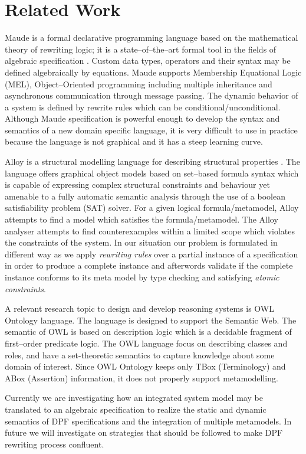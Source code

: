 \documentclass{eceasst}
\begin{document}
\section{Related Work}\label{lbl:relatedwork}
Maude is a formal declarative programming language based on the mathematical theory of rewriting logic; 
it is a state--of--the--art formal tool in the fields of algebraic specification \cite{Leeuwen90}. 
Custom data types, operators and their syntax may be defined algebraically by equations. 
Maude supports Membership Equational Logic (MEL), Object--Oriented programming including multiple inheritance and asynchronous communication through message passing.
The dynamic behavior of a system is defined by rewrite rules which can be conditional/unconditional. 
Although Maude specification is powerful enough to develop the syntax and semantics of a new domain specific language, it is very difficult to use in practice because 
the language is not graphical and 
it has a steep learning curve. 


Alloy is a structural modelling language for describing structural properties \cite{Jackson02}. 
The language offers graphical object models based on set--based formula syntax which is capable of expressing complex structural constraints and behaviour 
yet amenable to a fully automatic semantic analysis through the use of a boolean satisfiability problem (SAT) solver.
For a given logical formula/metamodel, Alloy attempts to find a model which satisfies the formula/metamodel. 
The Alloy analyser attempts to find counterexamples within a limited scope which violates the constraints of the system. 
In our situation our problem is formulated in different way as we apply \textit{rewriting rules} over a partial instance of a specification in order to produce a complete instance 
and afterwords validate if the complete instance conforms to its meta model by type checking and satisfying \textit{atomic constraints}. 

A relevant research topic to design and develop reasoning systems is OWL Ontology language. 
The language is designed to support the Semantic Web. 
The semantic of OWL is based on description logic \cite{Baader10} which is a decidable fragment of first--order predicate logic. 
The OWL language focus on describing classes and roles, and have a set-theoretic semantics to capture knowledge about some domain of interest. 
Since OWL Ontology keeps only TBox (Terminology) and ABox (Assertion) information, it does not properly support metamodelling.

Currently we are investigating how an integrated system model may be translated to an algebraic specification 
to realize the static and dynamic semantics of DPF specifications and the integration of multiple metamodels. 
In future we will investigate on strategies that should be followed to make DPF rewriting process confluent. 
\end{document}
